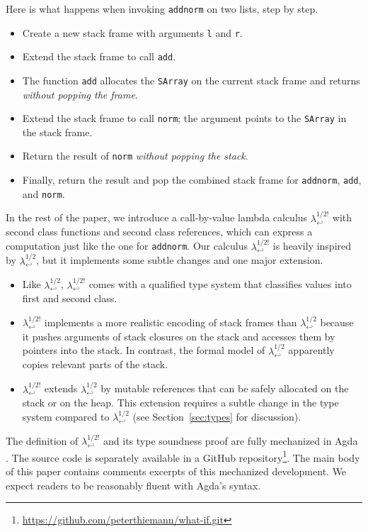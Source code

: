 \documentclass[sigplan,review,dvipsnames,screen,10pt]{acmart}
\newcommand{\LamWhatif}{\ensuremath{\lambda^{1/2}_{\hookleftarrow}}}
\newcommand{\LamOurs}{\ensuremath{\lambda^{1/2!}_{\hookleftarrow}}}
\begin{document}
Here is what happens when invoking \texttt{addnorm} on two lists, step by step.
\begin{itemize}
\item Create a new stack frame with arguments \lstinline|l| and
  \lstinline|r|.
\item Extend the stack frame to call \texttt{add}.
\item The function \texttt{add} allocates the
  \texttt{SArray} on the current stack frame and returns
  \emph{without popping the frame}.
\item Extend the stack frame to call \texttt{norm}; the argument
  points to the \texttt{SArray} in the stack frame.
\item Return the result of \texttt{norm} \emph{without popping the
    stack}.
\item Finally, return the result and pop the combined stack frame for
  \texttt{addnorm}, \texttt{add}, and \texttt{norm}.
\end{itemize}

In the rest of the paper, we introduce a call-by-value lambda calculus $\LamOurs$
with second class functions and second class references, which can
express a computation just like the one for \texttt{addnorm}. Our
calculus $\LamOurs$ is heavily inspired by $\LamWhatif$, but it
implements some subtle changes and one major extension.

\begin{itemize}
\item Like $\LamWhatif$, $\LamOurs$ comes with a qualified type system
  that classifies values into first and second class.
\item $\LamOurs$ implements a more realistic encoding of stack frames
  than $\LamWhatif$ because it pushes arguments of stack closures on
  the stack and accesses them by pointers into the stack. In contrast, the formal model of
  $\LamWhatif$ apparently copies relevant parts of the stack.
\item $\LamOurs$ extends $\LamWhatif$ by mutable references that can
  be safely allocated on the stack or on the heap. This extension
  requires a subtle change in the type system compared to $\LamWhatif$
  (see Section~\ref{sec:types} for discussion). 
\end{itemize}
The definition of $\LamOurs$ and its type soundness proof are fully
mechanized in Agda
\cite{DBLP:conf/afp/Norell08,team25:_agda_homep}. The source code is
separately available in a GitHub
repository\footnote{\url{https://github.com/peterthiemann/what-if.git}}. 
The main body of this paper contains comments excerpts of this
mechanized development. We expect readers to be reasonably fluent with
Agda's syntax. 
\end{document}
